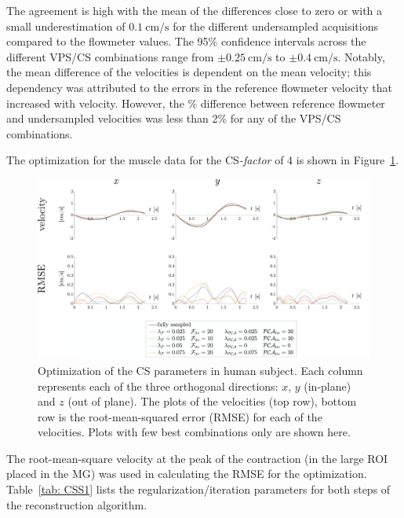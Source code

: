 The agreement is high with the mean of the differences close to zero or with a small underestimation of $\SI{0.1}{\centi\meter/\second}$ for the different undersampled acquisitions compared to the flowmeter values. 
The 95\% confidence intervals across the different VPS/CS combinations range from $\pm \SI{0.25}{\centi\meter/\second}$ to $\pm \SI{0.4}{\centi\meter/\second}$. 
Notably, the mean difference of the velocities is dependent on the mean velocity; this dependency was attributed to the errors in the reference flowmeter velocity that increased with velocity. 
However, the \% difference between reference flowmeter and undersampled velocities was less than 2\% for any of the VPS/CS combinations. 

The optimization for the muscle data for the \mbox{CS\textit{-factor}} of 4 is shown in Figure~\ref{fig: CS5}. 
\begin{figure}[!hb]
\vspace{+0.2cm}
\centering
\includegraphics[width=\textwidth]{Figures/CS1_9.pdf}
\caption[Optimization of the compressed sensing parameters in human subject]{Optimization of the CS parameters in human subject. Each column represents each of the three orthogonal directions: $x$, $y$ (in-plane) and $z$ (out of plane). The plots of the velocities (top row), bottom row is the root-mean-squared error (RMSE) for each of the velocities. Plots with few best combinations only are shown here.}
\label{fig: CS5}
\end{figure}
The root-mean-square velocity at the peak of the contraction (in the large ROI placed in the MG) was used in calculating the RMSE for the optimization. 
Table~\ref{tab: CSS1} lists the regularization/iteration parameters for both steps of the reconstruction algorithm. 
